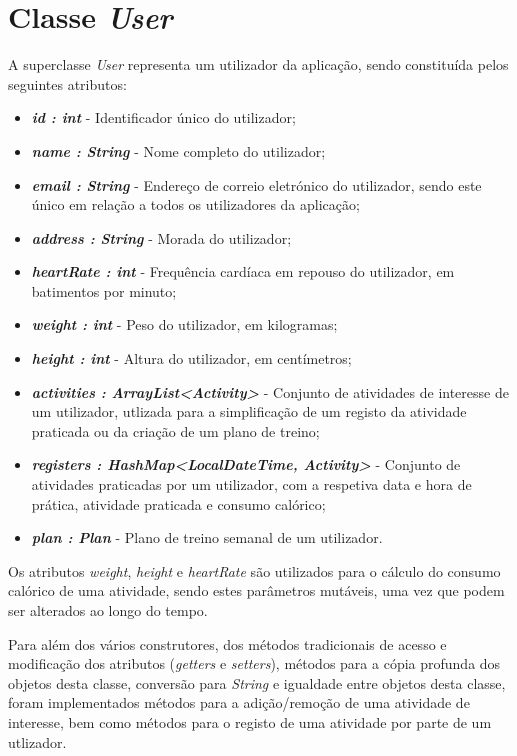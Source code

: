 \documentclass[a4paper,12pt]{scrreprt}
\begin{document}
\clearpage
\section{Classe \textit{User}}
    A superclasse \textit{User} representa um utilizador da aplicação, sendo constituída pelos seguintes atributos:

    \begin{itemize}
        \item \textit{\textbf{id : int}} - Identificador único do utilizador;
        \item \textit{\textbf{name : String}} - Nome completo do utilizador;
        \item \textit{\textbf{email : String}} - Endereço de correio eletrónico do utilizador, sendo este único em relação a todos os utilizadores da aplicação;
        \item \textit{\textbf{address : String}} - Morada do utilizador;
        \item \textit{\textbf{heartRate : int}} - Frequência cardíaca em repouso do utilizador, em batimentos por minuto;
        \item \textit{\textbf{weight : int}} - Peso do utilizador, em kilogramas;
        \item \textit{\textbf{height : int}} - Altura do utilizador, em centímetros;
        \item \textit{\textbf{activities : ArrayList<Activity>}} - Conjunto de atividades de interesse de um utilizador, utlizada para a simplificação de um registo da atividade praticada ou da criação de um plano de treino;
        \item \textit{\textbf{registers : HashMap<LocalDateTime, Activity>}} - Conjunto de atividades praticadas por um utilizador, com a respetiva data e hora de prática, atividade praticada e consumo calórico;
        \item \textit{\textbf{plan : Plan}} - Plano de treino semanal de um utilizador.
    \end{itemize}

    Os atributos \textit{weight}, \textit{height} e \textit{heartRate} são utilizados para o cálculo do consumo calórico de uma atividade,
    sendo estes parâmetros mutáveis, uma vez que podem ser alterados ao longo do tempo.

    Para além dos vários construtores, dos métodos tradicionais de acesso e modificação dos atributos (\textit{getters} e \textit{setters}), métodos para a cópia profunda dos objetos desta classe, conversão para \textit{String} e igualdade entre objetos desta classe, foram implementados métodos para a adição/remoção de uma atividade de interesse, bem como métodos para o registo de uma atividade por parte de um utlizador.
\end{document}
